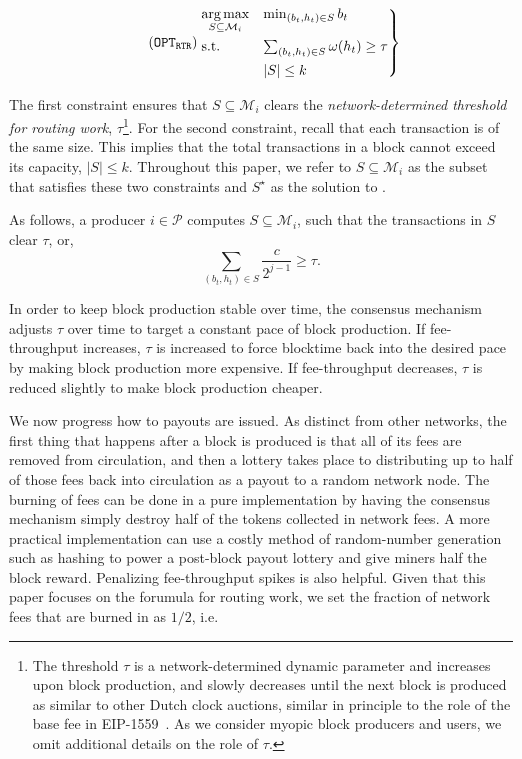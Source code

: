 \begin{align}\tag{\ourOPT}
    \begin{rcases}
        \underset{S\subseteq \mathcal{M}_i}{\mbox{arg}\max} & \min_{(b_t,h_t)\in S}  b_t \\
       \mbox{{s.t.}}\  & \sum_{(b_t,h_t)\in S} \omega(h_t) \geq \tau \\
       & |S| \leq k\\
   \end{rcases}
\end{align}

The first constraint ensures that $S\subseteq \mathcal{M}_i$ clears the \textit{network-determined threshold for routing work}, $\tau$\footnote{The threshold $\tau$ is a network-determined dynamic parameter and increases upon block production, and slowly decreases until the next block is produced as similar to other Dutch clock auctions, similar in principle to the role of the base fee in EIP-1559~\cite{buterin2019eip}. As we consider myopic block producers and users, we omit additional details on the role of $\tau$.}. For the second constraint, recall that each transaction is of the same size. This implies that the total transactions in a block cannot exceed its capacity, $|S| \leq k$. Throughout this paper, we refer to $S\subseteq \mathcal{M}_i$ as the subset that satisfies these two constraints and $S^\star$ as the solution to \ourOPT.

As follows, a producer $i \in \mathcal{P}$ computes $S \subseteq \mathcal{M}_i$, such that the transactions in $S$ clear $\tau$, or,
$$
\sum_{(b_t,h_t) \in S} \frac{c}{2^{j-1}} \geq \tau.
$$

In order to keep block production stable over time, the consensus mechanism adjusts $\tau$ over time to target a constant pace of block production. If fee-throughput increases, $\tau$ is increased to force blocktime back into the desired pace by making block production more expensive. If fee-throughput decreases, $\tau$ is reduced slightly to make block production cheaper.

We now progress how to payouts are issued. As distinct from other networks, the first thing that happens after a block is produced is that all of its fees are removed from circulation, and then a lottery takes place to distributing up to half of those fees back into circulation as a payout to a random network node. The burning of fees can be done in a pure implementation by having the consensus mechanism simply destroy half of the tokens collected in network fees. A more practical implementation can use a costly method of random-number generation such as hashing to power a post-block payout lottery and give miners half the block reward. Penalizing fee-throughput spikes is also helpful. Given that this paper focuses on the forumula for routing work, we set the fraction of network fees that are burned in \ourTFM  as $1/2$, i.e.

